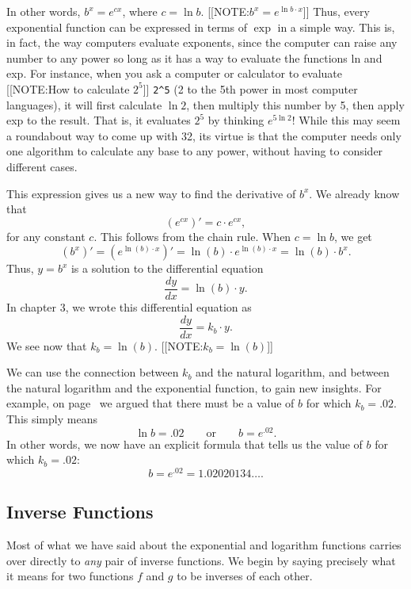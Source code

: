 In other words, $b^{\displaystyle x} = e^{\displaystyle cx}$, where $c
= \ln{b}$.
[[NOTE:$b^{x} = e^{\ln{b} \cdot x}$]]
Thus, every exponential function can be expressed in terms of $\exp$
in a simple way.  This is, in fact, the way computers evaluate
exponents, since the computer can raise any number to any power so
long as it has a way to evaluate the functions ln and exp.  For
instance, when you ask a computer or calculator to evaluate
[[NOTE:How to calculate $2^5$]] 
\verb+2^5+ (2 to the 5th power in most computer languages), it will
first calculate $\ln{2}$, then multiply this number by 5, then apply
exp to the result.  That is, it evaluates $2^5$ by thinking
$e^{5\ln{2}}$!  While this may seem a roundabout way to come up with
32, its virtue is that the computer needs only one algorithm to
calculate any base to any power, without having to consider different
cases.

	This expression gives us a new way to find the derivative of $b^x$.  We already know that
	\[
( e^{\displaystyle cx})' = 
		c \cdot e^{\displaystyle cx},
\]
for any constant $c$.  This follows from the chain rule.  When $c = \ln{b}$, we get
	\[
(b^{\displaystyle x})' = 
		(e^{\displaystyle \ln(b) \cdot x})' = 
		\ln(b) \cdot e^{\displaystyle \ln(b) \cdot x} = 
		\ln(b) \cdot b^{\displaystyle x}.
\]
Thus, $y = b^{\displaystyle x}$ is a solution to the differential equation
	\[
\dfrac{dy}{dx} = \ln(b) \cdot y.
\]
In chapter 3, we wrote this differential equation as
	\[
\dfrac{dy}{dx} = k_b \cdot y.
\]
We see now that $k_b = \ln(b)$.  
	[[NOTE:$k_b = \ln(b)$]]


We can use the connection between $k_b$ and the natural logarithm, and
between the natural logarithm and the exponential function, to gain
new insights.  For example, on page~\pageref{k_b} we argued that there
must be a value of $b$ for which $k_b = .02$.  This simply means
\[
\ln{b} = .02 \qquad \mbox{or} \qquad b = e^{.02}.
\]
In other words, we now have an explicit formula that tells us the
value of $b$ for which $k_b = .02$:
\[
b = e^{.02} = 1.02020134\ldots .
\]



\subsection{Inverse Functions}
\label{subsec:inverse-functions}

	Most of what we have said about the exponential and logarithm functions carries over directly to {\em any\/} pair of inverse functions.  We begin by saying precisely what it means for two functions $f$ and $g$ to be inverses of each other.




